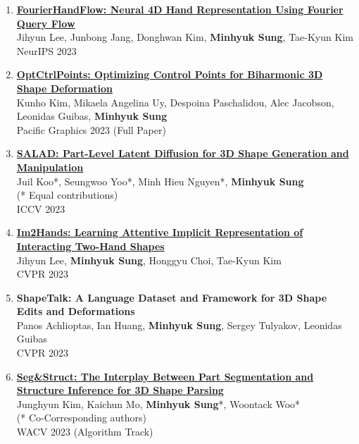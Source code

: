 \documentclass[letterpaper,10pt]{article} %
\newcommand{\blankline}{\quad\pagebreak[2]}
\begin{document}
{{\begin{enumerate}
\item \label{neurips23_1}
\href{https://arxiv.org/abs/2307.08100}{\textbf{FourierHandFlow: Neural 4D Hand Representation Using Fourier Query Flow}}\\
Jihyun Lee, Junbong Jang, Donghwan Kim, \textbf{Minhyuk Sung}, Tae-Kyun Kim\\
NeurIPS 2023\\
\blankline

\item \label{pg23}
\href{https://arxiv.org/abs/2309.12899}{\textbf{OptCtrlPoints: Optimizing Control Points for Biharmonic 3D Shape Deformation}}\\
Kunho Kim, Mikaela Angelina Uy, Despoina Paschalidou, Alec Jacobson, Leonidas Guibas, \textbf{Minhyuk Sung}\\
Pacific Graphics 2023 (Full Paper)\\
\blankline

\item \label{iccv23}
\href{https://arxiv.org/abs/2303.12236}{\textbf{SALAD: Part-Level Latent Diffusion for 3D Shape Generation and Manipulation}}\\
Juil Koo*, Seungwoo Yoo*, Minh Hieu Nguyen*, \textbf{Minhyuk Sung}\\
(* Equal contributions)\\
ICCV 2023\\
\blankline

\item \label{cvpr23_2}
\href{https://arxiv.org/abs/2302.14348}{\textbf{Im2Hands: Learning Attentive Implicit Representation of Interacting Two-Hand Shapes}}\\
Jihyun Lee, \textbf{Minhyuk Sung}, Honggyu Choi, Tae-Kyun Kim\\
CVPR 2023\\
\blankline

\item \label{cvpr23_1}
\textbf{ShapeTalk: A Language Dataset and Framework for 3D Shape Edits and Deformations}\\
Panos Achlioptas, Ian Huang, \textbf{Minhyuk Sung}, Sergey Tulyakov, Leonidas Guibas\\
CVPR 2023\\
\blankline

\item \label{wacv23}
\href{https://arxiv.org/abs/2212.05011}{\textbf{Seg\&Struct: The Interplay Between Part Segmentation and Structure Inference for 3D Shape Parsing}}\\
Junghyun Kim, Kaichun Mo, \textbf{Minhyuk Sung}*, Woontack Woo*\\
(* Co-Corresponding authors)\\
WACV 2023 (Algorithm Track)\\
\blankline


\end{enumerate}}}
\end{document}

